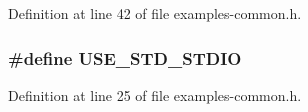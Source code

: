 Definition at line 42 of file examples-\/common.\+h.

\subsubsection[{\texorpdfstring{U\+S\+E\+\_\+\+S\+T\+D\+\_\+\+S\+T\+D\+IO}{USE_STD_STDIO}}]{\setlength{\rightskip}{0pt plus 5cm}\#define U\+S\+E\+\_\+\+S\+T\+D\+\_\+\+S\+T\+D\+IO}\hypertarget{examples-common_8h_ae8f98482924f7cbfd7a7b7f926b9bb17}{}\label{examples-common_8h_ae8f98482924f7cbfd7a7b7f926b9bb17}


Definition at line 25 of file examples-\/common.\+h.

